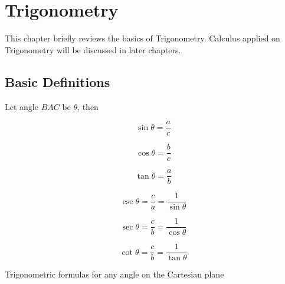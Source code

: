 \documentclass[a4paper]{book}
\begin{document}
\chapter{Trigonometry}
This chapter briefly reviews the basics of Trigonometry. Calculus applied on Trigonometry will be discussed in later chapters.

\section{Basic Definitions}

\setlength\fboxrule{0pt}

Let angle $BAC$ be $\theta$, then

\begin{description}
\item \begin{equation} \sin \theta = \frac{a}{c} \end{equation}
\item \begin{equation} \cos \theta = \frac{b}{c} \end{equation}
\item \begin{equation} \tan \theta = \frac{a}{b} \end{equation}
\item \begin{equation} \csc \theta = \frac{c}{a} = \frac{1}{\sin \theta} \end{equation}
\item \begin{equation} \sec \theta = \frac{c}{b} = \frac{1}{\cos \theta} \end{equation}
\item \begin{equation} \cot \theta = \frac{c}{b} = \frac{1}{\tan \theta} \end{equation}
\end{description}

Trigonometric formulas for any angle on the Cartesian plane
\end{document}
